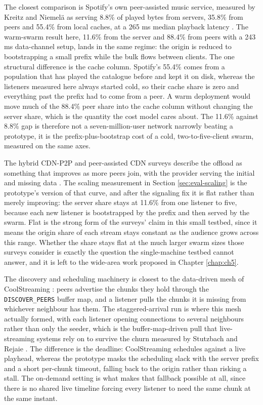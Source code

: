 \par The closest comparison is Spotify's own peer-assisted music service, measured by Kreitz and Niemel\"a as serving 8.8\% of played bytes from servers, 35.8\% from peers and 55.4\% from local caches, at a 265 ms median playback latency \cite{spotify_p2p}. The warm-swarm result here, 11.6\% from the server and 88.4\% from peers with a 243 ms data-channel setup, lands in the same regime: the origin is reduced to bootstrapping a small prefix while the bulk flows between clients. The one structural difference is the cache column. Spotify's 55.4\% comes from a population that has played the catalogue before and kept it on disk, whereas the listeners measured here always started cold, so their cache share is zero and everything past the prefix had to come from a peer. A warm deployment would move much of the 88.4\% peer share into the cache column without changing the server share, which is the quantity the cost model cares about. The 11.6\% against 8.8\% gap is therefore not a seven-million-user network narrowly beating a prototype, it is the prefix-plus-bootstrap cost of a cold, two-to-five-client swarm, measured on the same axes.

\par The hybrid CDN-P2P and peer-assisted CDN surveys describe the offload as something that improves as more peers join, with the provider serving the initial and missing data \cite{hybrid_cdn_p2p,pa_cdn_survey}. The scaling measurement in Section \ref{sec:eval-scaling} is the prototype's version of that curve, and after the signaling fix it is flat rather than merely improving: the server share stays at 11.6\% from one listener to five, because each new listener is bootstrapped by the prefix and then served by the swarm. Flat is the strong form of the surveys' claim in this small testbed, since it means the origin share of each stream stays constant as the audience grows across this range. Whether the share stays flat at the much larger swarm sizes those surveys consider is exactly the question the single-machine testbed cannot answer, and it is left to the wide-area work proposed in Chapter \ref{chap:ch5}.

\par The discovery and scheduling machinery is closest to the data-driven mesh of CoolStreaming \cite{coolstreaming}: peers advertise the chunks they hold through the \texttt{DISCOVER\_PEERS} buffer map, and a listener pulls the chunks it is missing from whichever neighbour has them. The staggered-arrival run is where this mesh actually formed, with each listener opening connections to several neighbours rather than only the seeder, which is the buffer-map-driven pull that live-streaming systems rely on to survive the churn measured by Stutzbach and Rejaie \cite{measurement_p2p}. The difference is the deadline: CoolStreaming schedules against a live playhead, whereas the prototype masks the scheduling slack with the server prefix and a short per-chunk timeout, falling back to the origin rather than risking a stall. The on-demand setting is what makes that fallback possible at all, since there is no shared live timeline forcing every listener to need the same chunk at the same instant.

